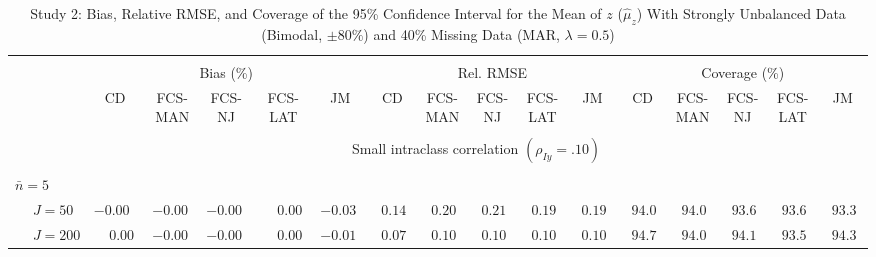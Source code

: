 \begin{sidewaystable}
\begin{threeparttable}
\setlength{\tabcolsep}{1.0pt}
\renewcommand{\arraystretch}{0.95}
\footnotesize
\caption{\small Study 2: Bias, Relative RMSE, and Coverage of the 95\% Confidence Interval for the Mean of $z$ ($\hat\mu_z$) With Strongly Unbalanced Data (Bimodal, $\pm 80\%$) and 40\% Missing Data (MAR, $\lambda=0.5$)}
\begin{tabular}{llccccccccccccccc}
\hline\\[-1.8ex]
& & \multicolumn{5}{c}{Bias (\%)} & \multicolumn{5}{c}{Rel. RMSE} & \multicolumn{5}{c}{Coverage (\%)} \\ \cmidrule(r){3-7}\cmidrule(r){8-12}\cmidrule(r){13-17}
 &  & CD & \makecell{FCS-\\MAN} & \makecell{FCS-\\NJ} & \makecell{FCS-\\LAT} & JM & CD & \makecell{FCS-\\MAN} & \makecell{FCS-\\NJ} & \makecell{FCS-\\LAT} & JM & CD & \makecell{FCS-\\MAN} & \makecell{FCS-\\NJ} & \makecell{FCS-\\LAT} & \multicolumn{1}{c}{JM} \\ 
[0.4ex]\hline\\[-1.8ex]
& & \multicolumn{15}{c}{Small intraclass correlation $(\rho_{Iy}=.10)$} \\[0.6ex]\hline\\[-1.8ex]
\multicolumn{4}{l}{$\bar{n}=5$} \\  & \nopagebreak $\;J=50$  & ${-}0.00\phantom{0}$ & ${-}0.00\phantom{0}$ & ${-}0.00\phantom{0}$ & $\phantom{-}0.00\phantom{0}$ & ${-}0.03\phantom{0}$ & $\phantom{0}0.14\phantom{0}$ & $\phantom{0}0.20\phantom{0}$ & $\phantom{0}0.21\phantom{0}$ & $\phantom{0}0.19\phantom{0}$ & $\phantom{0}0.19\phantom{0}$ & $\phantom{0}94.0\phantom{0}$ & $\phantom{0}94.0\phantom{0}$ & $\phantom{0}93.6\phantom{0}$ & $\phantom{0}93.6\phantom{0}$ & $\phantom{0}93.3\phantom{0}$ \\
 & \nopagebreak $\;J=200$  & $\phantom{-}0.00\phantom{0}$ & ${-}0.00\phantom{0}$ & ${-}0.00\phantom{0}$ & $\phantom{-}0.00\phantom{0}$ & ${-}0.01\phantom{0}$ & $\phantom{0}0.07\phantom{0}$ & $\phantom{0}0.10\phantom{0}$ & $\phantom{0}0.10\phantom{0}$ & $\phantom{0}0.10\phantom{0}$ & $\phantom{0}0.10\phantom{0}$ & $\phantom{0}94.7\phantom{0}$ & $\phantom{0}94.0\phantom{0}$ & $\phantom{0}94.1\phantom{0}$ & $\phantom{0}93.5\phantom{0}$ & $\phantom{0}94.3\phantom{0}$ \\

\end{tabular}
\end{threeparttable}
\end{sidewaystable}
